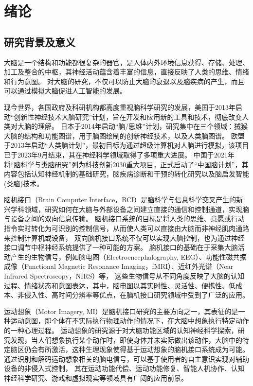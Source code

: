 
\chapter{绪论}

\section{研究背景及意义}

大脑是一个结构和功能都很复杂的器官，是人体内外环境信息获得、存储、处理、加工及整合的中枢\cite{LXTX201902004}，其神经活动蕴含着丰富的信息，直接反映了人类的思维、情绪和行为意图。
对大脑的研究，不仅可以防止大脑的衰退以及脑疾病的产生，而且可以通过模拟大脑促进人工智能的发展\cite{KYYX201907013}。

现今世界，各国政府及科研机构都高度重视脑科学研究的发展，美国于2013年启动“创新性神经技术大脑研究”计划，旨在开发和应用新的工具和技术，彻底改变人类对大脑的理解\cite{jorgenson2015brain}。
日本于2014年启动“脑/思维”计划，研究集中在三个领域：狨猴大脑的结构和功能图谱，用于脑图绘制的创新神经技术，以及人类脑图谱\cite{okano2015brain}。
欧盟于2013年启动“人类脑计划”，最初目标为通过超级计算机对人脑进行模拟，该项目已于2023年9月结束，其在神经科学领域取得了多项重大进展\cite{naddaf2023europe}。
中国于2021年将“脑科学与类脑研究”列为科技创新2030重大项目\cite{china2021brain}，正式启动了“中国脑计划”，其内容包括认知神经机制的基础研究，脑疾病诊断和干预的转化研究以及脑启发智能(类脑)技术\cite{POO2016591}。

脑机接口（Brain Computer Interface，BCI）是脑科学与信息科学交叉产生的新兴学科领域，研究如何在大脑与外部设备之间建立直接的通信和控制通道，实现脑与设备之间的双向信息传输\cite{DKJS202106005}。
脑机接口系统的目标是将人类的思维、意愿或行动指令实时转化为可识别的控制信号，从而使人类可以直接由大脑而非神经肌肉通路来控制计算机或设备，
双向脑机接口系统不仅可以实现大脑控制，也为通过神经接口调节中枢神经系统提供了一种可能的方案\cite{he2020brain}。
脑机接口的基础在于采集大脑活动产生的生物信号，例如脑电图（Electroencephalography, EEG）、功能性磁共振成像（Functional Magnetic Resonance Imaging，fMRI）、近红外光谱（Near Infrared Spectroscopy，NIRS）等，
这些生物信号从不同角度反映了大脑的认知过程、情绪状态和意图表达，其中，脑电图以其实时性、灵活性、便携性、低成本、非侵入性、高时间分辨率等优点，在脑机接口研究领域中受到了广泛的应用。

运动想象（Motor Imagery, MI）是脑机接口研究的主要方向之一，其表征的是一种运动意图，即个体在不实际执行物理动作的情况下，在大脑中想象执行特定动作的一种心理过程。
运动想象的研究源于对大脑功能区域的认知神经科学探索，研究发现，当人们想象执行某个动作时，即使身体并未实际做出该动作，大脑中的特定脑区仍会有所激活，这种生理现象使得基于运动想象的脑机接口系统成为可能。通过识别和解码运动想象相关的脑电信号，可以基于使用者的自主意识实现对辅助设备的非侵入式控制，
其在运动功能代偿、运动功能修复\cite{pichiorri2015brain}、智能人机协作、认知神经科学研究、游戏和虚拟现实等领域具有广阔的应用前景。

